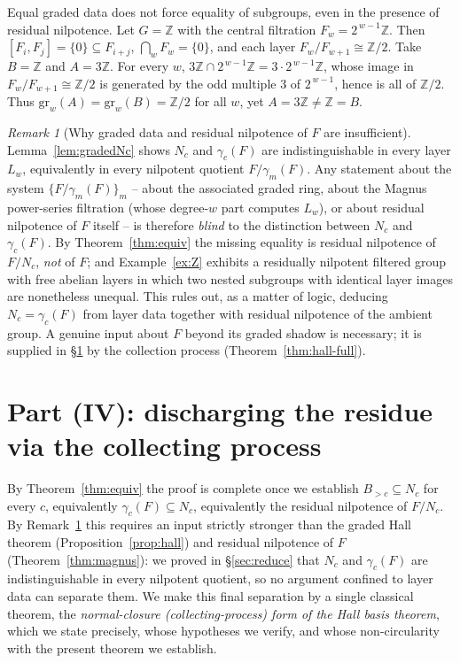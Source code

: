 \documentclass{amsart}
\theoremstyle{definition}
\theoremstyle{remark}
\newtheorem{remark}{Remark}
\begin{document}
\begin{example}\label{ex:Z}
Equal graded data does not force equality of subgroups, even in the presence of
residual nilpotence. Let $G=\mathbb Z$ with the central filtration
$F_w=2^{\,w-1}\mathbb Z$. Then $[F_i,F_j]=\{0\}\subseteq F_{i+j}$,
$\bigcap_w F_w=\{0\}$, and each layer $F_w/F_{w+1}\cong\mathbb Z/2$. Take
$B=\mathbb Z$ and $A=3\mathbb Z$. For every $w$,
$3\mathbb Z\cap2^{\,w-1}\mathbb Z=3\cdot2^{\,w-1}\mathbb Z$, whose image in
$F_w/F_{w+1}\cong\mathbb Z/2$ is generated by the odd multiple $3$ of
$2^{\,w-1}$, hence is all of $\mathbb Z/2$. Thus
$\mathrm{gr}_w(A)=\mathrm{gr}_w(B)=\mathbb Z/2$ for all $w$, yet
$A=3\mathbb Z\ne\mathbb Z=B$.
\end{example}

\begin{remark}[Why graded data and residual nilpotence of $F$ are insufficient]
\label{rem:graded-insufficient}
Lemma~\ref{lem:gradedNc} shows $N_c$ and $\gamma_c(F)$ are indistinguishable in
every layer $L_w$, equivalently in every nilpotent quotient $F/\gamma_m(F)$. Any
statement about the system $\{F/\gamma_m(F)\}_m$ -- about the associated graded
ring, about the Magnus power-series filtration (whose degree-$w$ part computes
$L_w$), or about residual nilpotence of $F$ itself -- is therefore \emph{blind} to
the distinction between $N_c$ and $\gamma_c(F)$. By Theorem~\ref{thm:equiv} the
missing equality is residual nilpotence of $F/N_c$, \emph{not} of $F$; and
Example~\ref{ex:Z} exhibits a residually nilpotent filtered group with free
abelian layers in which two nested subgroups with identical layer images are
nonetheless unequal. This rules out, as a matter of logic, deducing
$N_c=\gamma_c(F)$ from layer data together with residual nilpotence of the ambient
group. A genuine input about $F$ beyond its graded shadow is necessary; it is
supplied in \S\ref{sec:final} by the collection process
(Theorem~\ref{thm:hall-full}).
\end{remark}

\section{Part (IV): discharging the residue via the collecting process}\label{sec:final}

By Theorem~\ref{thm:equiv} the proof is complete once we establish
$B_{>c}\subseteq N_c$ for every $c$, equivalently $\gamma_c(F)\subseteq N_c$,
equivalently the residual nilpotence of $F/N_c$. By
Remark~\ref{rem:graded-insufficient} this requires an input strictly stronger than
the graded Hall theorem (Proposition~\ref{prop:hall}) and residual nilpotence of
$F$ (Theorem~\ref{thm:magnus}): we proved in \S\ref{sec:reduce} that $N_c$ and
$\gamma_c(F)$ are indistinguishable in every nilpotent quotient, so no argument
confined to layer data can separate them. We make this final separation by a single
classical theorem, the \emph{normal-closure (collecting-process) form of the Hall
basis theorem}, which we state precisely, whose hypotheses we verify, and whose
non-circularity with the present theorem we establish.
\end{document}
